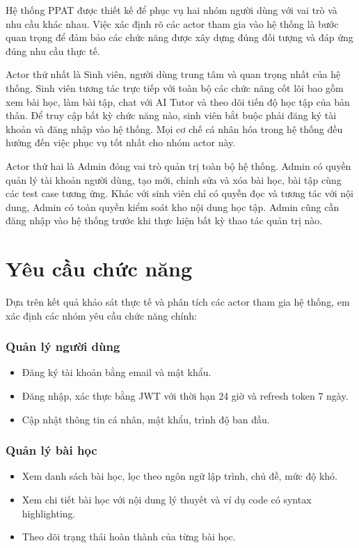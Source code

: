 \documentclass[../main.tex]{subfiles}
\begin{document}
Hệ thống PPAT được thiết kế để phục vụ hai nhóm người dùng với vai trò và nhu cầu khác nhau. Việc xác định rõ các actor tham gia vào hệ thống là bước quan trọng để đảm bảo các chức năng được xây dựng đúng đối tượng và đáp ứng đúng nhu cầu thực tế.

Actor thứ nhất là Sinh viên, người dùng trung tâm và quan trọng nhất của hệ thống. Sinh viên tương tác trực tiếp với toàn bộ các chức năng cốt lõi bao gồm xem bài học, làm bài tập, chat với AI Tutor và theo dõi tiến độ học tập của bản thân. Để truy cập bất kỳ chức năng nào, sinh viên bắt buộc phải đăng ký tài khoản và đăng nhập vào hệ thống. Mọi cơ chế cá nhân hóa trong hệ thống đều hướng đến việc phục vụ tốt nhất cho nhóm actor này.

Actor thứ hai là Admin đóng vai trò quản trị toàn bộ hệ thống. Admin có quyền quản lý tài khoản người dùng, tạo mới, chỉnh sửa và xóa bài học, bài tập cùng các test case tương ứng. Khác với sinh viên chỉ có quyền đọc và tương tác với nội dung, Admin có toàn quyền kiểm soát kho nội dung học tập. Admin cũng cần đăng nhập vào hệ thống trước khi thực hiện bất kỳ thao tác quản trị nào.

\section{Yêu cầu chức năng}

Dựa trên kết quả khảo sát thực tế và phân tích các actor tham gia hệ thống, em xác định các nhóm yêu cầu chức năng chính:

\subsubsection{Quản lý người dùng}

\begin{itemize}
    \item Đăng ký tài khoản bằng email và mật khẩu.
    \item Đăng nhập, xác thực bằng JWT với thời hạn 24 giờ và refresh token 7 ngày.
    \item Cập nhật thông tin cá nhân, mật khẩu, trình độ ban đầu.
\end{itemize}

\subsubsection{Quản lý bài học}

\begin{itemize}
    \item Xem danh sách bài học, lọc theo ngôn ngữ lập trình, chủ đề, mức độ khó.
    \item Xem chi tiết bài học với nội dung lý thuyết và ví dụ code có syntax highlighting.
    \item Theo dõi trạng thái hoàn thành của từng bài học.
\end{itemize}
\end{document}
